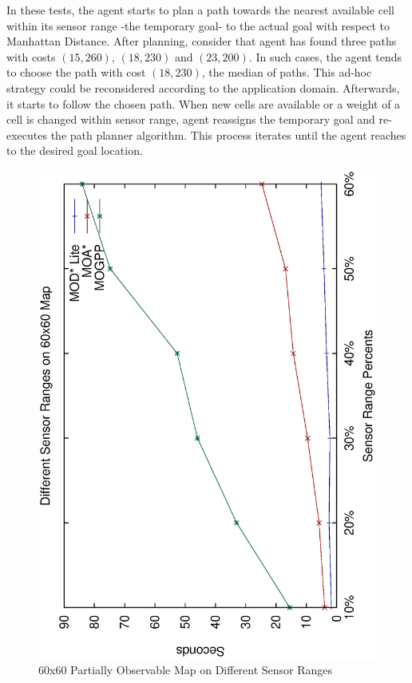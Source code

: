\documentclass[10pt,journal]{IEEEtran}
\begin{document}
In these tests, the agent starts to plan a path towards the nearest available cell within its sensor range -the temporary goal- to the actual goal with respect to Manhattan Distance. After planning, consider that agent has found three paths with costs $(15, 260)$, $(18, 230)$ and $(23, 200)$. In such cases, the agent tends to choose the path with cost $(18, 230)$, the median of paths. This ad-hoc strategy could be reconsidered according to the application domain. Afterwards, it starts to follow the chosen path. When new cells are available or a weight of a cell is changed within sensor range, agent reassigns the temporary goal and re-executes the path planner algorithm. This process iterates until the agent reaches to the desired goal location.

\begin{figure}
\centering
\includegraphics[scale=0.3]{experimental/60x60_partially_normal}
\caption{60x60 Partially Observable Map on Different Sensor Ranges}
\label{fig:60x60sensor}
\end{figure}
\end{document}

